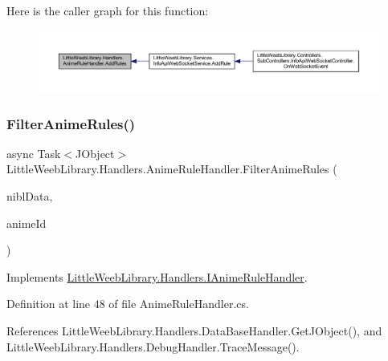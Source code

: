 Here is the caller graph for this function\+:\nopagebreak
\begin{figure}[H]
\begin{center}
\leavevmode
\includegraphics[width=350pt]{class_little_weeb_library_1_1_handlers_1_1_anime_rule_handler_a469232c6b73d0ceff935c4ef2d78d039_icgraph}
\end{center}
\end{figure}
\mbox{\label{class_little_weeb_library_1_1_handlers_1_1_anime_rule_handler_a503fb2839489e1df8b80c9a461c0fd2b}} 
\subsubsection{\texorpdfstring{Filter\+Anime\+Rules()}{FilterAnimeRules()}}
{\footnotesize\ttfamily async Task$<$J\+Object$>$ Little\+Weeb\+Library.\+Handlers.\+Anime\+Rule\+Handler.\+Filter\+Anime\+Rules (\begin{DoxyParamCaption}\item[{J\+Object}]{nibl\+Data,  }\item[{string}]{anime\+Id }\end{DoxyParamCaption})}



Implements \mbox{\hyperlink{interface_little_weeb_library_1_1_handlers_1_1_i_anime_rule_handler_ad82316c84b3b1a7870ff94107b420cc6}{Little\+Weeb\+Library.\+Handlers.\+I\+Anime\+Rule\+Handler}}.



Definition at line 48 of file Anime\+Rule\+Handler.\+cs.



References Little\+Weeb\+Library.\+Handlers.\+Data\+Base\+Handler.\+Get\+J\+Object(), and Little\+Weeb\+Library.\+Handlers.\+Debug\+Handler.\+Trace\+Message().



